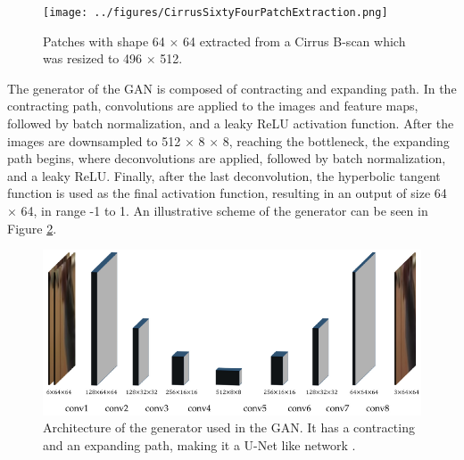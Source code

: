 \begin{figure}[!ht]
	\centering
	\texttt{[image: ../figures/CirrusSixtyFourPatchExtraction.png]}
	\caption{Patches with shape 64 $\times$ 64 extracted from a Cirrus B-scan which was resized to 496 $\times$ 512.}
	\label{fig:CirrusSixtyFourPatchExtraction}
\end{figure}

The generator of the GAN is composed of contracting and expanding path. In the contracting path, convolutions are applied to the images and feature maps, followed by batch normalization, and a leaky ReLU activation function. After the images are downsampled to 512 $\times$ 8 $\times$ 8, reaching the bottleneck, the expanding path begins, where deconvolutions are applied, followed by batch normalization, and a leaky ReLU. Finally, after the last deconvolution, the hyperbolic tangent function is used as the final activation function, resulting in an output of size 64 $\times$ 64, in range -1 to 1. An illustrative scheme of the generator can be seen in Figure \ref{fig:GeneratorArchitecture}.

\begin{figure}
	\centering
	\includegraphics[width=1.0\linewidth]{figures/GeneratorArchitecture}
	\caption{Architecture of the generator used in the GAN. It has a contracting and an expanding path, making it a U-Net like network \parencite{Tran2020}.}
	\label{fig:GeneratorArchitecture}
\end{figure}


